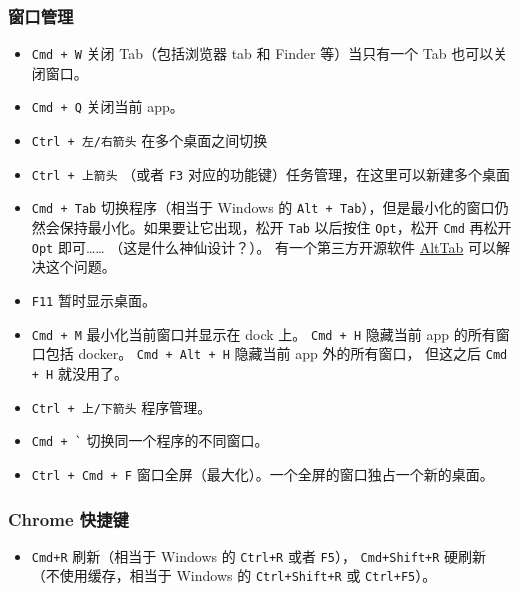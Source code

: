 \subsubsection{窗口管理}
\begin{itemize}
\
\item \verb`Cmd + W` 关闭 Tab（包括浏览器 tab 和 Finder 等）当只有一个 Tab 也可以关闭窗口。
\item \verb`Cmd + Q` 关闭当前 app。
\item \verb`Ctrl + 左/右箭头` 在多个桌面之间切换
\item \verb`Ctrl + 上箭头` （或者 \verb`F3` 对应的功能键）任务管理，在这里可以新建多个桌面
\item \verb`Cmd + Tab` 切换程序（相当于 Windows 的 \verb`Alt + Tab`），但是最小化的窗口仍然会保持最小化。如果要让它出现，松开 \verb`Tab` 以后按住 \verb`Opt`，松开 \verb`Cmd` 再松开 \verb`Opt` 即可…… （这是什么神仙设计？）。 有一个第三方开源软件 \href{https://alt-tab-macos.netlify.app/}{AltTab} 可以解决这个问题。
\item \verb`F11` 暂时显示桌面。
\item \verb`Cmd + M` 最小化当前窗口并显示在 dock 上。 \verb`Cmd + H` 隐藏当前 app 的所有窗口包括 docker。 \verb`Cmd + Alt + H` 隐藏当前 app 外的所有窗口， 但这之后 \verb`Cmd + H` 就没用了。
\item \verb`Ctrl + 上/下箭头` 程序管理。
\item \verb|Cmd + `| 切换同一个程序的不同窗口。
\item \verb`Ctrl + Cmd + F` 窗口全屏（最大化）。一个全屏的窗口独占一个新的桌面。
\end{itemize}

\subsubsection{Chrome 快捷键}
\begin{itemize}
\item \verb`Cmd+R` 刷新（相当于 Windows 的 \verb`Ctrl+R` 或者 \verb`F5`）， \verb`Cmd+Shift+R` 硬刷新（不使用缓存，相当于 Windows 的 \verb`Ctrl+Shift+R` 或 \verb`Ctrl+F5`）。
\end{itemize}

